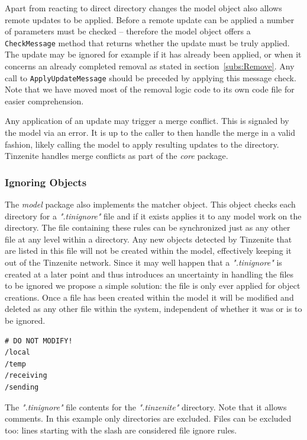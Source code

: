 Apart from reacting to direct directory changes the model object also allows remote updates to be applied.
Before a remote update can be applied a number of parameters must be checked -- therefore the model object offers a \texttt{CheckMessage} method that returns whether the update must be truly applied.
The update may be ignored for example if it has already been applied, or when it concerns an already completed removal as stated in section~\ref{subs:Remove}.
Any call to \texttt{ApplyUpdateMessage} should be preceded by applying this message check.
Note that we have moved most of the removal logic code to its own code file for easier comprehension.

Any application of an update may trigger a merge conflict.
This is signaled by the model via an error.
It is up to the caller to then handle the merge in a valid fashion, likely calling the model to apply resulting updates to the directory.
Tinzenite handles merge conflicts as part of the \emph{core} package.

\subsubsection{Ignoring Objects}
\label{subs:Ignoring Objects}

The \emph{model} package also implements the matcher object.
This object checks each directory for a \textit{".tinignore"} file and if it exists applies it to any model work on the directory.
The file containing these rules can be synchronized just as any other file at any level within a directory.
Any new objects detected by Tinzenite that are listed in this file will not be created within the model, effectively keeping it out of the Tinzenite network.
Since it may well happen that a \textit{".tinignore"} is created at a later point and thus introduces an uncertainty in handling the files to be ignored we propose a simple solution: the file is only ever applied for object creations.
Once a file has been created within the model it will be modified and deleted as any other file within the system, independent of whether it was or is to be ignored.

\begin{listing}[htp]
    \begin{lstlisting}[language=golang,firstnumber=0]
# DO NOT MODIFY!
/local
/temp
/receiving
/sending
    \end{lstlisting}
\caption[Meta Ignore File]{The \textit{".tinignore"} file contents for the \textit{".tinzenite"} directory. Note that it allows comments. In this example only directories are excluded. Files can be excluded too: lines starting with the slash are considered file ignore rules.}
\label{tinignore:meta}
\end{listing}

